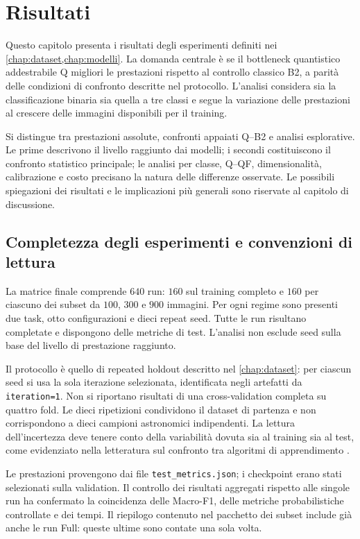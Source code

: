 \chapter{Risultati}
\label{chap:risultati}

Questo capitolo presenta i risultati degli esperimenti definiti nei
\cref{chap:dataset,chap:modelli}. La domanda centrale è se il
bottleneck quantistico addestrabile Q migliori le prestazioni rispetto
al controllo classico B2, a parità delle condizioni di confronto
descritte nel protocollo. L'analisi considera sia la classificazione
binaria sia quella a tre classi e segue la variazione delle prestazioni
al crescere delle immagini disponibili per il training.

Si distingue tra prestazioni assolute, confronti appaiati Q--B2 e
analisi esplorative. Le prime descrivono il livello raggiunto dai
modelli; i secondi costituiscono il confronto statistico principale;
le analisi per classe, Q--QF, dimensionalità, calibrazione e costo
precisano la natura delle differenze osservate. Le possibili
spiegazioni dei risultati e le implicazioni più generali sono
riservate al capitolo di discussione.

\section{Completezza degli esperimenti e convenzioni di lettura}
\label{sec:ris-completezza}

La matrice finale comprende \(640\) run: \(160\) sul training completo
e \(160\) per ciascuno dei subset da \(100\), \(300\) e \(900\)
immagini. Per ogni regime sono presenti due task, otto configurazioni
e dieci repeat seed. Tutte le run risultano completate e dispongono
delle metriche di test. L'analisi non esclude seed sulla base del
livello di prestazione raggiunto.

Il protocollo è quello di repeated holdout descritto nel
\cref{chap:dataset}: per ciascun seed si usa la sola iterazione
selezionata, identificata negli artefatti da \texttt{iteration=1}.
Non si riportano risultati di una cross-validation completa su quattro
fold. Le dieci ripetizioni condividono il dataset di partenza e non
corrispondono a dieci campioni astronomici indipendenti. La lettura
dell'incertezza deve tenere conto della variabilità dovuta sia al
training sia al test, come evidenziato nella letteratura sul confronto
tra algoritmi di apprendimento \cite{nadeau2003inference}.

Le prestazioni provengono dai file \texttt{test\_metrics.json}; i
checkpoint erano stati selezionati sulla validation. Il controllo dei
risultati aggregati rispetto alle singole run ha confermato la
coincidenza delle Macro-F1, delle metriche probabilistiche controllate
e dei tempi. Il riepilogo contenuto nel pacchetto dei subset include
già anche le run Full: queste ultime sono contate una sola volta.

